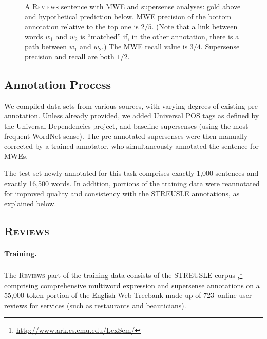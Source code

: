 \documentclass[11pt,letterpaper]{article}
\makeatletter
\newcommand{\ensuretext}[1]{#1}
\newcommand{\nssmarker}{\ensuretext{\textcolor{magenta}{\ensuremath{^{\textsc{NS}}_{\textsc{S}}}}}}
\newcommand{\dhmarker}{\ensuretext{\textcolor{red}{\ensuremath{^{\textsc{D}}_{\textsc{H}}}}}}
\newcommand{\arkcomment}[3]{\ensuretext{\textcolor{#3}{[#1 #2]}}}
\newcommand{\nss}[1]{\arkcomment{\nssmarker}{#1}{magenta}}
\newcommand{\dirk}[1]{\arkcomment{\dhmarker}{#1}{red}}
\newcommand{\sst}[1]{\textsc{#1}} %
\newcommand{\tagtss}[5]{\begin{tabular}{@{\hspace{2pt}}c@{\hspace{2pt}}} \texttt{#2\vphantom{\textlarger{Ĩ}}}\\ \sst{#3}\vphantom{X} \\ \textbf{#1}\vphantom{lp} \\ \sst{#5}\vphantom{X} \\ \texttt{#4\vphantom{\textlarger{Ĩ}}}\end{tabular}}
\newcommand{\dataset}[1]{\mbox{\textsc{#1}}}	%
\newcommand{\finalversion}[1]{}
\makeatother
\begin{document}
\begin{figure}
\caption{A \textsc{Reviews} sentence with MWE and supersense analyses: gold above and hypothetical prediction below. 
MWE precision of the bottom annotation relative to the top one is $2/5$. %
(Note that a link between words $w_1$ and $w_2$ is ``matched'' 
if, in the other annotation, there is a path between $w_1$ and $w_2$.) 
The MWE recall value is $3/4$. 
Supersense precision and recall are both $1/2$.
}
\label{fig:linkmeasure}
\end{figure}

\subsection{Annotation Process}
We compiled data sets from various sources, with varying degrees of existing pre-annotation. 
Unless already provided, we added Universal POS tags as defined by the Universal Dependencies project, 
and baseline supersenses (using the most frequent WordNet sense). 
The pre-annotated supersenses were then manually corrected by a trained annotator, 
who simultaneously annotated the sentence for MWEs. 
\finalversion{\nss{TODO: training time, IAA}The annotator spent XXX hours of training on a dedicated data set,\dirk{how many, Nathan?} 
before annotating the data sets.}

The test set newly annotated for this task comprises exactly 1,000 sentences and exactly 16,500 words.
In addition, portions of the training data were reannotated for improved quality and consistency 
with the STREUSLE annotations, as explained below.\finalversion{\nss{total size of training data?}}

\subsection{\dataset{Reviews}} 
\paragraph{Training.}
The \dataset{Reviews} part of the training data consists of the STREUSLE corpus \citep{schneider-14-corpus,schneider-15},\footnote{\url{http://www.ark.cs.cmu.edu/LexSem/}}
comprising comprehensive multiword expression and supersense annotations on a 55,000-token portion of the English Web Treebank \citep[EWTB;][]{ewtb} 
made up of 723~online user reviews for services (such as restaurants and beauticians).
\end{document}
